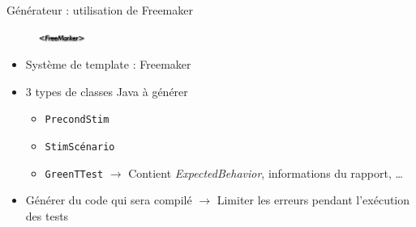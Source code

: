 \documentclass{beamer}
\begin{document}
\begin{frame}{Générateur : utilisation de Freemaker}
	~
	\begin{figure}
		\includegraphics[width=1.5cm]{FreeMaker.png}
	\end{figure}
	\vspace{-30px}
	\begin{itemize}
		\item Système de template : Freemaker
			\vfill
			\pause
		\item 3 types de classes Java à générer
		\begin{itemize}
			\item \texttt{PrecondStim}
			\item \texttt{StimScénario}
			\item \texttt{GreenTTest} $\rightarrow$ Contient \textit{ExpectedBehavior}, informations du rapport, \ldots
		\end{itemize}
		\pause
			\vfill
		\item Générer du code qui sera compilé\newline
			$\rightarrow$ Limiter les erreurs pendant l'exécution des tests
	\end{itemize}
\end{frame}
\end{document}
